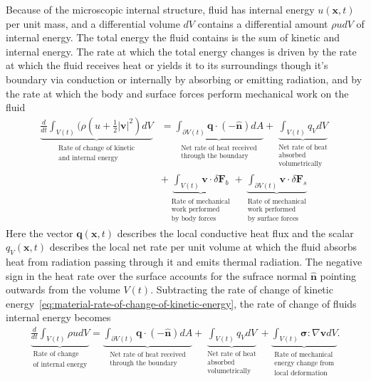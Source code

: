 Because of the microscopic internal structure, fluid has internal energy $u(\bm{x},t)$ per unit mass, and a differential volume $dV$ contains a differential amount $\rho u dV$ of internal energy. The total energy the fluid contains is the sum of kinetic and internal energy. The rate at which the total energy changes is driven by the rate at which the fluid receives heat or yields it to its surroundings though it's boundary via conduction or internally by absorbing or emitting radiation, and by the rate at which the body and surface forces perform mechanical work on the fluid
\begin{align}\label{eq:total-energy-balance-material-volume}
    \underbrace{\frac{d}{dt}\int_{V(t)}(\rho(u+\frac{1}{2}|\bm{v}|^2)dV}_{\substack{\text{Rate of change of kinetic}\\\text{and internal energy}}}
    &=
    \underbrace{\int_{\partial V(t)}\bm{q}\cdot(-\bm{\hat{n}})dA}_{\substack{\text{Net rate of heat received}\\\text{through the boundary}}}+\underbrace{\int_{V(t)}q_VdV}_{\substack{\text{Net rate of heat}\\\text{absorbed}\\\text{volumetrically}}}\nonumber\\
    &+\underbrace{\int_{V(t)}\bm{v}\cdot\delta\bm{F}_b}_{\substack{\text{Rate of mechanical}\\\text{work performed}\\\text{by body forces}}}+\underbrace{\int_{\partial V(t)}\bm{v}\cdot\delta\bm{F}_s}_{\substack{\text{Rate of mechanical}\\\text{work performed}\\\text{by surface forces}}}
\end{align}
Here the vector $\bm{q}(\bm{x},t)$ describes the local conductive heat flux and the scalar $q_V(\bm{x},t)$ describes the local net rate per unit volume at which the fluid absorbs heat from radiation passing through it and emits thermal radiation. The negative sign in the heat rate over the surface accounts for the sufrace normal $\bm{\hat{n}}$ pointing outwards from the volume $V(t)$. Subtracting the rate of change of kinetic energy~\eqref{eq:material-rate-of-change-of-kinetic-energy}, the rate of change of fluids internal energy becomes 
\begin{align}\label{eq:energy-balance-material-volume}
    \underbrace{\frac{d}{dt}\int_{V(t)}\rho udV}_{\substack{\text{Rate of change}\\\text{of internal energy}}}=\underbrace{\int_{\partial V(t)}\bm{q}\cdot(-\bm{\hat{n}})dA}_{\substack{\text{Net rate of heat received}\\\text{through the boundary}}}+\underbrace{\int_{V(t)}q_VdV}_{\substack{\text{Net rate of heat}\\\text{absorbed}\\\text{volumetrically}}}+\underbrace{\int_{V(t)}\bm{\sigma}:\nabla\bm{v}dV}_{\substack{\text{Rate of mechanical}\\\text{energy change from}\\\text{local deformation}}}.
\end{align}
